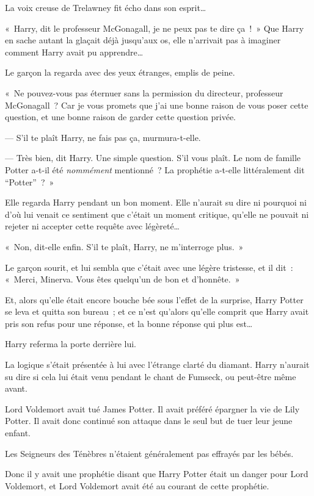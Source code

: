 La voix creuse de Trelawney fit écho dans son esprit…

«~Harry, dit le professeur McGonagall, je ne peux pas te dire ça~!~»
Que Harry en sache autant la glaçait déjà jusqu'aux os, elle n'arrivait pas à imaginer comment Harry avait pu apprendre…

Le garçon la regarda avec des yeux étranges, emplis de peine.

«~Ne pouvez-vous pas éternuer sans la permission du directeur, professeur McGonagall~?
Car je vous promets que j'ai une bonne raison de vous poser cette question, et une bonne raison de garder cette question privée.

--- S'il te plaît Harry, ne fais pas ça, murmura-t-elle.

--- Très bien, dit Harry.
Une simple question.
S'il vous plaît.
Le nom de famille Potter a-t-il été \emph{nommément} mentionné~?
La prophétie a-t-elle littéralement dit “Potter”~?~»

Elle regarda Harry pendant un bon moment.
Elle n'aurait su dire ni pourquoi ni d'où lui venait ce sentiment que c'était un moment critique, qu'elle ne pouvait ni rejeter ni accepter cette requête avec légèreté…

«~Non, dit-elle enfin.
S'il te plaît, Harry, ne m'interroge plus.~»

Le garçon sourit, et lui sembla que c'était avec une légère tristesse, et il dit~: «~Merci, Minerva.
Vous êtes quelqu'un de bon et d'honnête.~»

Et, alors qu'elle était encore bouche bée sous l'effet de la surprise, Harry Potter se leva et quitta son bureau~; et ce n'est qu'alors qu'elle comprit que Harry avait pris son refus pour une réponse, et la bonne réponse qui plus est…

Harry referma la porte derrière lui.

La logique s'était présentée à lui avec l'étrange clarté du diamant.
Harry n'aurait su dire si cela lui était venu pendant le chant de Fumseck, ou peut-être même avant.

Lord Voldemort avait tué James Potter.
Il avait préféré épargner la vie de Lily Potter.
Il avait donc continué son attaque dans le seul but de tuer leur jeune enfant.

Les Seigneurs des Ténèbres n'étaient généralement pas effrayés par les bébés.

Donc il y avait une prophétie disant que Harry Potter était un danger pour Lord Voldemort, et Lord Voldemort avait été au courant de cette prophétie.

